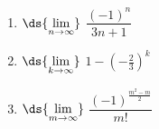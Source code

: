 \documentclass{ximera}
\begin{document}
\begin{multicols}{3}
\begin{enumerate}
\setcounter{enumi}{\value{HW}}

\item\label{limsqueezefirst}  $\ds{\lim_{n \rightarrow \infty}}$ $\dfrac{(-1)^{n}}{3n+1}$

\item  $\ds{\lim_{k \rightarrow \infty}}$ $1 - \left( - \frac{2}{3}  \right)^{k} $

\item\label{limsqueezelast}  $\ds{\lim_{m \rightarrow \infty}}$ $\dfrac{(-1)^{ \frac{m^2-m}{2}} }{m!}$

\setcounter{HW}{\value{enumi}}
\end{enumerate}
\end{multicols}
\end{document}
